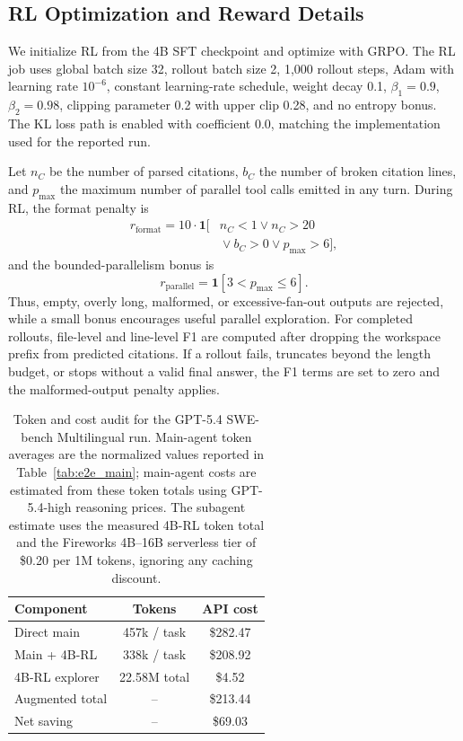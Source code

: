 \documentclass{llmxive}
\begin{document}
\subsection{RL Optimization and Reward Details}
\label{app:reward-details}

We initialize RL from the 4B SFT checkpoint and optimize with GRPO.
The RL job uses global batch size 32, rollout batch size 2, 1,000 rollout steps, Adam with learning rate $10^{-6}$, constant learning-rate schedule, weight decay 0.1, $\beta_1=0.9$, $\beta_2=0.98$, clipping parameter 0.2 with upper clip 0.28, and no entropy bonus.
The KL loss path is enabled with coefficient 0.0, matching the implementation used for the reported run.

Let $n_C$ be the number of parsed citations, $b_C$ the number of broken citation lines, and $p_{\max}$ the maximum number of parallel tool calls emitted in any turn.
During RL, the format penalty is
\begin{equation}
\begin{aligned}
r_{\mathrm{format}}
= 10 \cdot \mathbf{1}[{}&n_C < 1 \lor n_C > 20 \\
&{}\lor b_C > 0 \lor p_{\max} > 6],
\end{aligned}
\end{equation}
and the bounded-parallelism bonus is
\begin{equation}
r_{\mathrm{parallel}}
= \mathbf{1}[3 < p_{\max} \le 6].
\end{equation}
Thus, empty, overly long, malformed, or excessive-fan-out outputs are rejected, while a small bonus encourages useful parallel exploration.
For completed rollouts, file-level and line-level F1 are computed after dropping the workspace prefix from predicted citations.
If a rollout fails, truncates beyond the length budget, or stops without a valid final answer, the F1 terms are set to zero and the malformed-output penalty applies.
\begin{table}[t]
\centering
\small
\setlength{\tabcolsep}{4pt}
\begin{tabular}{lcc}
\toprule
\textbf{Component} & \textbf{Tokens} & \textbf{API cost} \\
\midrule
Direct main & 457k / task & \$282.47 \\
Main + 4B-RL & 338k / task & \$208.92 \\
4B-RL explorer & 22.58M total & \$4.52 \\
\midrule
Augmented total & -- & \$213.44 \\
Net saving & -- & \$69.03 \\
\bottomrule
\end{tabular}
\caption{Token and cost audit for the GPT-5.4 SWE-bench Multilingual run. Main-agent token averages are the normalized values reported in Table~\ref{tab:e2e_main}; main-agent costs are estimated from these token totals using GPT-5.4-high reasoning prices. The subagent estimate uses the measured 4B-RL token total and the Fireworks 4B--16B serverless tier of \$0.20 per 1M tokens, ignoring any caching discount.}
\label{tab:runtime-cost}
\end{table}
\end{document}
